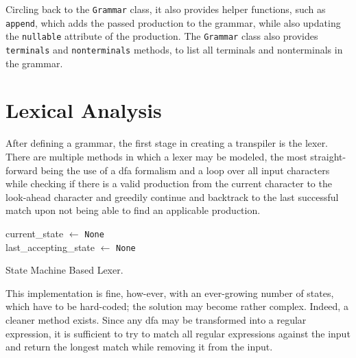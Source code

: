 Circling back to the \texttt{Grammar} class, it also provides helper functions, such as \texttt{append}, which adds the passed production to the grammar, while also updating the \texttt{nullable} attribute of the production. The \texttt{Grammar} class also provides \texttt{terminals} and \texttt{nonterminals} methods, to list all terminals and nonterminals in the grammar.


\section{Lexical Analysis}
After defining a grammar, the first stage in creating a transpiler is the lexer. There are multiple methods in which a lexer may be modeled, the most straight-forward being the use of a \gls{dfa} formalism and a loop over all input characters while checking if there is a valid production from the current character to the look-ahead character and greedily continue and backtrack to the last successful match upon not being able to find an applicable production.

\begingroup
\vspace{1.5em}
\begin{algorithm}[H]
\setlength{\algomargin}{1.5em}
current\_state $\gets$ \texttt{None}\\
last\_accepting\_state $\gets$ \texttt{None}

    


\caption{State Machine Based Lexer.}
\label{alg:lexer-state-based}
\end{algorithm}
\vspace{1.5em}
\endgroup

This implementation is fine, how-ever, with an ever-growing number of states, which have to be hard-coded; the solution may become rather complex. Indeed, a cleaner method exists. Since any \gls{dfa} may be transformed into a regular expression, it is sufficient to try to match all regular expressions against the input and return the longest match while removing it from the input. 


